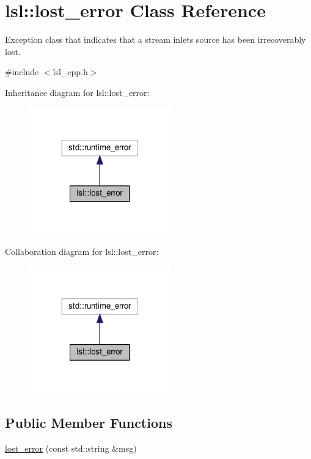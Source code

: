 \hypertarget{classlsl_1_1lost__error}{}\section{lsl\+:\+:lost\+\_\+error Class Reference}
\label{classlsl_1_1lost__error}


Exception class that indicates that a stream inlet\textquotesingle{}s source has been irrecoverably lost.  




{\ttfamily \#include $<$lsl\+\_\+cpp.\+h$>$}



Inheritance diagram for lsl\+:\+:lost\+\_\+error\+:\nopagebreak
\begin{figure}[H]
\begin{center}
\leavevmode
\includegraphics[width=173pt]{d5/d0b/classlsl_1_1lost__error__inherit__graph}
\end{center}
\end{figure}


Collaboration diagram for lsl\+:\+:lost\+\_\+error\+:\nopagebreak
\begin{figure}[H]
\begin{center}
\leavevmode
\includegraphics[width=173pt]{d7/d36/classlsl_1_1lost__error__coll__graph}
\end{center}
\end{figure}
\subsection*{Public Member Functions}
\begin{DoxyCompactItemize}
\item 
\hyperlink{classlsl_1_1lost__error_a997ff6ff1ecd4fd33cda631b975d386e}{lost\+\_\+error} (const std\+::string \&msg)
\end{DoxyCompactItemize}


